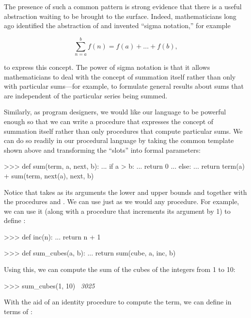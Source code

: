 \noindent
The presence of such a common pattern is strong evidence that there is a useful
abstraction waiting to be brought to the surface.  Indeed, mathematicians long
ago identified the abstraction of  and invented
``sigma notation,'' for example

$$ \sum\limits_{n=a}^b f(n) = f(a) + \dots + f(b), $$

\noindent
to express this concept.  The power of sigma notation is that it allows
mathematicians to deal with the concept of summation itself rather than only
with particular sums---for example, to formulate general results about sums
that are independent of the particular series being summed.

Similarly, as program designers, we would like our language to be powerful
enough so that we can write a procedure that expresses the concept of summation
itself rather than only procedures that compute particular sums.  We can do so
readily in our procedural language by taking the common template shown above
and transforming the ``slots'' into formal parameters:

\begin{codeBlock}
>>> def sum(term, a, next, b):
...     if a > b:
...         return 0
...     else:
...         return term(a) + sum(term, next(a), next, b)
\end{codeBlock}

\noindent
Notice that  takes as its arguments the lower and upper bounds
 and  together with the procedures  and .
We can use  just as we would any procedure.  For example, we can use
it (along with a procedure  that increments its argument by 1) to
define :

\begin{codeBlock}
>>> def inc(n):
...     return n + 1

>>> def sum_cubes(a, b):
...     return sum(cube, a, inc, b)
\end{codeBlock}

\noindent
Using this, we can compute the sum of the cubes of the integers from 1 to 10:

\begin{codeBlock}
>>> sum_cubes(1, 10)
~\textit{3025}~
\end{codeBlock}

\noindent
With the aid of an identity procedure to compute the term, we can define
 in terms of :

